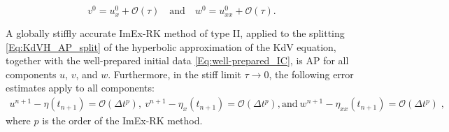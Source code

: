 \documentclass[10pt,a4paper]{amsart}
\newcommand{\ukdv}{\eta}
\begin{document}
\begin{equation}\label{Eq:well-prepared_IC}
    v^{0} = u^{0}_x +  \mathcal{O}(\tau) \quad \text{and} \quad w^{0} = u^{0}_{xx} +  \mathcal{O}(\tau).
\end{equation}

\begin{thm}\label{Th:AP_result_type_II}
    A globally stiffly accurate ImEx-RK method of type II, applied to the splitting \eqref{Eq:KdVH_AP_split} of the hyperbolic
    approximation of the KdV equation, together with the well-prepared initial data \eqref{Eq:well-prepared_IC}, is AP for all
    components $u$, $v$, and $w$. Furthermore, in the stiff limit $\tau \to 0$, the following error estimates apply to all
    components:
    \begin{align*}
        u^{n+1} - \ukdv(t_{n+1}) = \mathcal{O}(\Delta t^p), \ v^{n+1} - \ukdv_{x}(t_{n+1}) = \mathcal{O}(\Delta t^p),
        \textrm{and} \ w^{n+1} - \ukdv_{xx}(t_{n+1}) = \mathcal{O}(\Delta t^p)\;,
    \end{align*}
    where $p$ is the order of the ImEx-RK method.
\end{thm}
\end{document}
